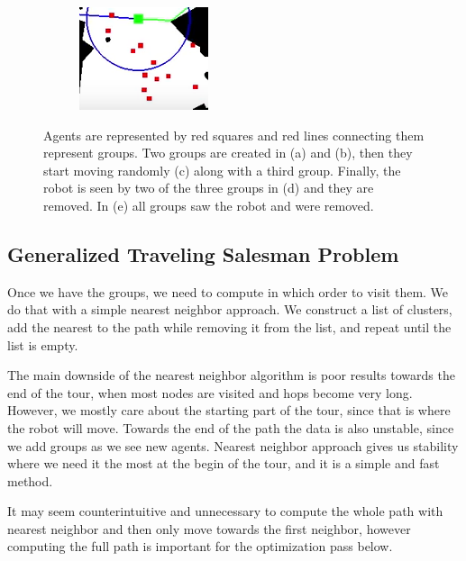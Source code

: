 \documentclass[]{article}
\begin{document}
\begin{figure}[h]
\begin{subfigure}{0.19\textwidth}
    \includegraphics[width=\linewidth]{pics/cluster5.png}
    \caption{}
\end{subfigure}
\caption{Agents are represented by red squares and red lines connecting them represent groups. Two groups are created in (a) and (b), then they start moving randomly (c) along with a third group. Finally, the robot is seen by two of the three groups in (d) and they are removed. In (e) all groups saw the robot and were removed.}
\label{fig:groups}
\end{figure}

\subsection{Generalized Traveling Salesman Problem}
Once we have the groups, we need to compute in which order to visit them. We do that with a simple nearest neighbor approach. We construct a list of clusters, add the nearest to the path while removing it from the list, and repeat until the list is empty. 

The main downside of the nearest neighbor algorithm is poor results towards the end of the tour, when most nodes are visited and hops become very long. However, we mostly care about the starting part of the tour, since that is where the robot will move. Towards the end of the path the data is also unstable, since we add groups as we see new agents. Nearest neighbor approach gives us stability where we need it the most at the begin of the tour, and it is a simple and fast method.

It may seem counterintuitive and unnecessary to compute the whole path with nearest neighbor and then only move towards the first neighbor, however computing the full path is important for the optimization pass below.
\end{document}
